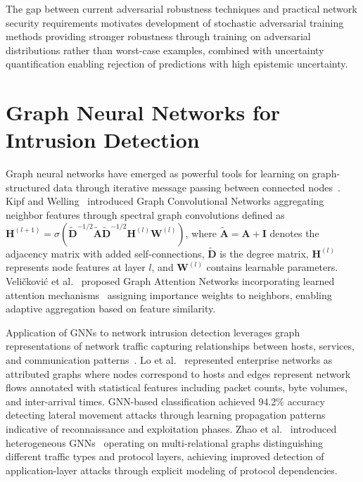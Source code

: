 The gap between current adversarial robustness techniques and practical network security requirements motivates development of stochastic adversarial training methods providing stronger robustness through training on adversarial distributions rather than worst-case examples, combined with uncertainty quantification enabling rejection of predictions with high epistemic uncertainty.

\section{Graph Neural Networks for Intrusion Detection}
\label{sec:lit_gnn}

Graph neural networks have emerged as powerful tools for learning on graph-structured data through iterative message passing between connected nodes~\cite{scarselli2009graph,zhou2020graph}. Kipf and Welling~\cite{kipf2017semi} introduced Graph Convolutional Networks aggregating neighbor features through spectral graph convolutions defined as $\mathbf{H}^{(l+1)} = \sigma(\tilde{\mathbf{D}}^{-1/2}\tilde{\mathbf{A}}\tilde{\mathbf{D}}^{-1/2}\mathbf{H}^{(l)}\mathbf{W}^{(l)})$, where $\tilde{\mathbf{A}} = \mathbf{A} + \mathbf{I}$ denotes the adjacency matrix with added self-connections, $\tilde{\mathbf{D}}$ is the degree matrix, $\mathbf{H}^{(l)}$ represents node features at layer $l$, and $\mathbf{W}^{(l)}$ contains learnable parameters. Veličković et al.~\cite{velickovic2018graph} proposed Graph Attention Networks incorporating learned attention mechanisms~\cite{vaswani2017attention} assigning importance weights to neighbors, enabling adaptive aggregation based on feature similarity.

Application of GNNs to network intrusion detection leverages graph representations of network traffic capturing relationships between hosts, services, and communication patterns~\cite{jiang2019graph,choi2022graph}. Lo et al.~\cite{lo2017espot} represented enterprise networks as attributed graphs where nodes correspond to hosts and edges represent network flows annotated with statistical features including packet counts, byte volumes, and inter-arrival times. GNN-based classification achieved 94.2\% accuracy detecting lateral movement attacks through learning propagation patterns indicative of reconnaissance and exploitation phases. Zhao et al.~\cite{zhao2021hetgnn} introduced heterogeneous GNNs~\cite{hu2020heterogeneous} operating on multi-relational graphs distinguishing different traffic types and protocol layers, achieving improved detection of application-layer attacks through explicit modeling of protocol dependencies.

